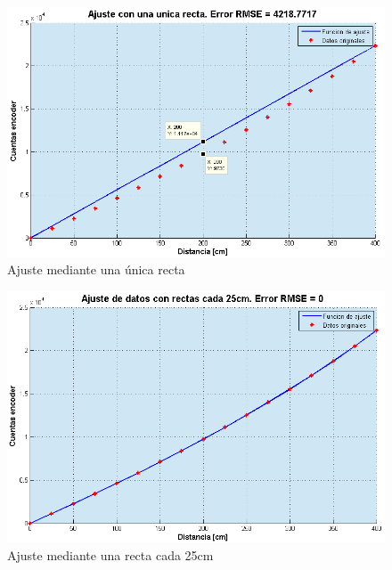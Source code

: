 \begin{figure}[!ht]
	\centering
	\includegraphics[width=15cm,scale=1]{resources/3_11-ajusteRectasUnica.png}
	\caption{Ajuste mediante una única recta}
	\label{fig:\thefigure}
\end{figure}

\begin{figure}[!ht]
	\centering
	\includegraphics[width=15cm,scale=1]{resources/3_12-ajusteRectas25cm.png}
	\caption{Ajuste mediante una recta cada 25cm}
	\label{fig:\thefigure}
\end{figure}

